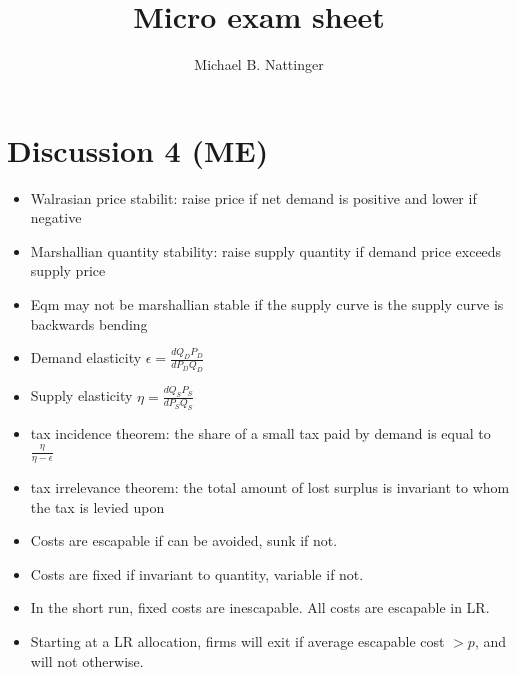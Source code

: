 \documentclass[11pt]{article} %
\title{Micro exam sheet}
\author{Michael B. Nattinger}
\begin{document}
\maketitle

\section{Discussion 4 (ME)}
\begin{itemize}
\item Walrasian price stabilit: raise price if net demand is positive and lower if negative
\item Marshallian quantity stability: raise supply quantity if demand price exceeds supply price
\item Eqm may not be marshallian stable if the supply curve is the supply curve is backwards bending
\item Demand elasticity $\epsilon = \frac{dQ_D P_D}{dP_D Q_D}$
\item Supply elasticity $\eta = \frac{dQ_S P_S}{dP_S Q_S}$
\item tax incidence theorem: the share of a small tax paid by demand is equal to $\frac{\eta}{\eta - \epsilon}$
\item tax irrelevance theorem: the total amount of lost surplus is invariant to whom the tax is levied upon
\item Costs are escapable if can be avoided, sunk if not.
\item Costs are fixed if invariant to quantity, variable if not.
\item In the short run, fixed costs are inescapable. All costs are escapable in LR.
\item Starting at a LR allocation, firms will exit if average escapable cost $>p$, and will not otherwise.
\end{itemize}
\end{document}
